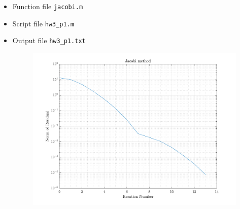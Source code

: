 \begin{solution}
  \quad
  \begin{itemize}
    \item
      Function file \verb|jacobi.m|
      
    \item
      Script file \verb|hw3_p1.m|
      
    \item
      Output file \verb|hw3_p1.txt|
      
      \begin{figure}[!hbtp]
        \centering
        \includegraphics[width=0.8\linewidth]{../src/hw3_p1.pdf}
        \caption{}%
        \label{fig:}
      \end{figure}
  \end{itemize}
\end{solution}

